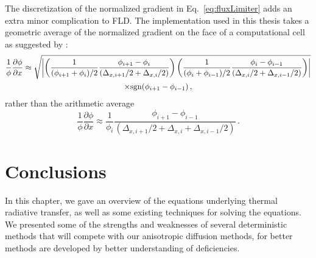 The discretization of the normalized gradient in Eq.~\eqref{eq:fluxLimiter}
adds an extra minor complication to FLD. The implementation
used in this thesis takes a geometric average of the normalized gradient on the
face of a computational cell as suggested by \cite{Ols2007}:
\begin{multline*}
 \frac{1}{\phi} \frac{\partial \phi}{\partial x}
  \approx
\sqrt{\left|  \left(  \frac{1}{(\phi_{i+1} + \phi_{i})/2} \frac{\phi_{i+1} - \phi_{i}}
 { (\Delta_{x,i+1}/2 + \Delta_{x,i}/2)} \right)
\left(  \frac{1}{(\phi_{i} + \phi_{i-1})/2} \frac{\phi_{i} - \phi_{i-1}}
{ (\Delta_{x,i}/2 + \Delta_{x,i-1}/2)} \right)  \right|}
\\
\times
 \mathrm{sgn}(\phi_{i+1} - \phi_{i-1})\,,
\end{multline*}
rather than the arithmetic average
\begin{equation*}
 \frac{1}{\phi} \frac{\partial \phi}{\partial x}
  \approx
 \frac{1}{\phi_{i}} \frac{\phi_{i+1} - \phi_{i-1}}
 { (\Delta_{x,i+1}/2 + \Delta_{x,i} + \Delta_{x,i-1}/2)}\,.
\end{equation*}

\section{Conclusions}

In this chapter, we gave an overview of the equations underlying thermal
radiative transfer, as well as some existing techniques for solving the
equations. We presented some of the strengths and weaknesses of several
deterministic methods that will compete with our anisotropic diffusion methods,
for better methods are developed by better understanding of deficiencies.

